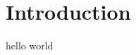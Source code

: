 \documentclass{ms}
\begin{document}
  \maketitle
  \section{Introduction}
  hello world
\end{document}
